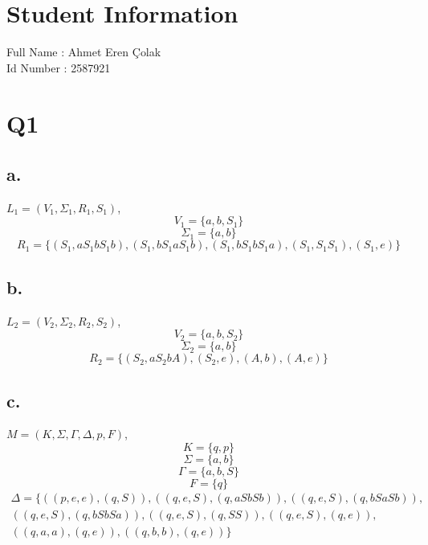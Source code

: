 \documentclass[12pt]{article}
\begin{document}
\section*{Student Information } 
Full Name :  Ahmet Eren {\c C}olak \\
Id Number :  2587921

\section*{Q1}
\subsection*{a.}
$L_1 = (V_1, \Sigma_1, R_1, S_1)$,
	\begin{equation*}
		V_1 = \{a,b, S_1\}
	\end{equation*}
	\begin{equation*}
		\Sigma_1 = \{a,b\}
	\end{equation*}
	\begin{equation*}
		R_1 = \{(S_1, aS_1bS_1b), (S_1, bS_1aS_1b), (S_1, bS_1bS_1a), (S_1, S_1S_1), (S_1, e)\}
	\end{equation*}
\subsection*{b.}
$L_2 = (V_2, \Sigma_2, R_2, S_2)$,
	\begin{equation*}
		V_2 = \{a,b, S_2\}
	\end{equation*}
	\begin{equation*}
		\Sigma_2 = \{a,b\}
	\end{equation*}
	\begin{equation*}
		R_2 = \{(S_2, aS_2bA), (S_2, e), (A, b), (A, e)\}
	\end{equation*}
\subsection*{c.}
$M = (K, \Sigma, \Gamma, \Delta, p, F)$,
	\begin{equation*}
		K = \{q, p\}
	\end{equation*}
	\begin{equation*}
		\Sigma = \{a, b\}
	\end{equation*}
	\begin{equation*}
		\Gamma = \{a, b, S\}
	\end{equation*}
	\begin{equation*}
		F = \{q\} 
	\end{equation*}
	\begin{equation*}
		\begin{split}
			\Delta = \{((p,e,e), (q, S)), ((q,e,S), (q, aSbSb)), ((q,e,S), (q, bSaSb)),\\ ((q,e,S), (q, bSbSa)), ((q,e,S), (q, SS)), ((q,e,S), (q, e)),\\ ((q,a,a), (q,e)), ((q,b,b), (q,e))\}
		\end{split}
	\end{equation*}
\end{document}
